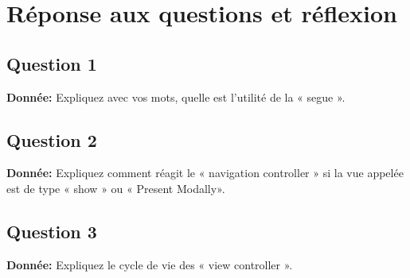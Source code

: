 \section{Réponse aux questions et réflexion}
\subsection{Question 1}
\textbf{Donnée: }Expliquez avec vos mots, quelle est l’utilité de la « segue ».\\

\subsection{Question 2}
\textbf{Donnée: }Expliquez comment réagit le « navigation controller » si la vue appelée est de type « show » ou « Present Modally».\\

\subsection{Question 3}
\textbf{Donnée: }Expliquez le cycle de vie des « view controller ».\\

